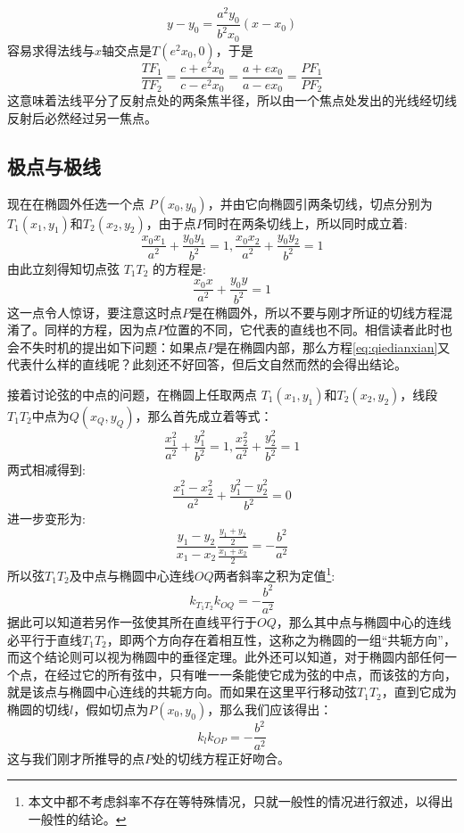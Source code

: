 \begin{equation*}
y-y_0=\frac{a^2y_0}{b^2x_0}(x-x_0)
\end{equation*}
容易求得法线与$x$轴交点是$T(e^2x_0,0)$，于是
\begin{equation*}
  \frac{TF_1}{TF_2}=\frac{c+e^2x_0}{c-e^2x_0}=\frac{a+ex_0}{a-ex_0}=\frac{PF_1}{PF_2}
\end{equation*}
这意味着法线平分了反射点处的两条焦半径，所以由一个焦点处发出的光线经切线反射后必然经过另一焦点。

\subsection{极点与极线}
\label{sec:oval-polor-point-and-polor-line}

现在在椭圆外任选一个点 $P(x_0,y_0)$，并由它向椭圆引两条切线，切点分别为 $T_1(x_1,y_1)$和$T_2(x_2,y_2)$，由于点$P$同时在两条切线上，所以同时成立着:
\begin{equation}
\frac{x_0 x_1}{a^2}+\frac{y_0 y_1}{b^2} = 1,\frac{x_0 x_2}{a^2}+\frac{y_0 y_2}{b^2} = 1
\end{equation}
由此立刻得知切点弦 $T_1 T_2$ 的方程是:
\begin{equation}
\frac{x_0x}{a^2}+\frac{y_0y}{b^2}=1   \label{eq:qiedianxian}
\end{equation}
这一点令人惊讶，要注意这时点$P$是在椭圆外，所以不要与刚才所证的切线方程混淆了。同样的方程，因为点$P$位置的不同，它代表的直线也不同。相信读者此时也会不失时机的提出如下问题：如果点$P$是在椭圆内部，那么方程\ref{eq:qiedianxian}又代表什么样的直线呢？此刻还不好回答，但后文自然而然的会得出结论。

接着讨论弦的中点的问题，在椭圆上任取两点 $T_1(x_1,y_1)$和$T_2(x_2,y_2)$，线段$T_1T_2$中点为$Q(x_Q,y_Q)$，那么首先成立着等式：
\begin{equation}
\frac{x_1^2}{a^2}+\frac{y_1^2}{b^2}=1, \frac{x_2^2}{a^2}+\frac{y_2^2}{b^2}=1
\end{equation}
两式相减得到:
\begin{equation}
\frac{x_1^2-x_2^2}{a^2}+\frac{y_1^2-y_2^2}{b^2}=0
\end{equation}
进一步变形为:
\begin{equation}
\frac{y_1-y_2}{x_1-x_2}\frac{\frac{y_1+y_2}{2}}{\frac{x_1+x_2}{2}}=-\frac{b^2}{a^2}
\end{equation}
所以弦$T_1T_2$及中点与椭圆中心连线$OQ$两者斜率之积为定值\footnote{本文中都不考虑斜率不存在等特殊情况，只就一般性的情况进行叙述，以得出一般性的结论。}:
\begin{equation}
k_{T_1T_2}k_{OQ}=-\frac{b^2}{a^2}
\end{equation}
据此可以知道若另作一弦使其所在直线平行于$OQ$，那么其中点与椭圆中心的连线必平行于直线$T_1T_2$，即两个方向存在着相互性，这称之为椭圆的一组“共轭方向”，而这个结论则可以视为椭圆中的垂径定理。此外还可以知道，对于椭圆内部任何一个点，在经过它的所有弦中，只有唯一一条能使它成为弦的中点，而该弦的方向，就是该点与椭圆中心连线的共轭方向。而如果在这里平行移动弦$T_1T_2$，直到它成为椭圆的切线$l$，假如切点为$P(x_0,y_0)$，那么我们应该得出：
\begin{equation}
k_l k_{OP}=-\frac{b^2}{a^2}
\end{equation}
这与我们刚才所推导的点$P$处的切线方程正好吻合。


